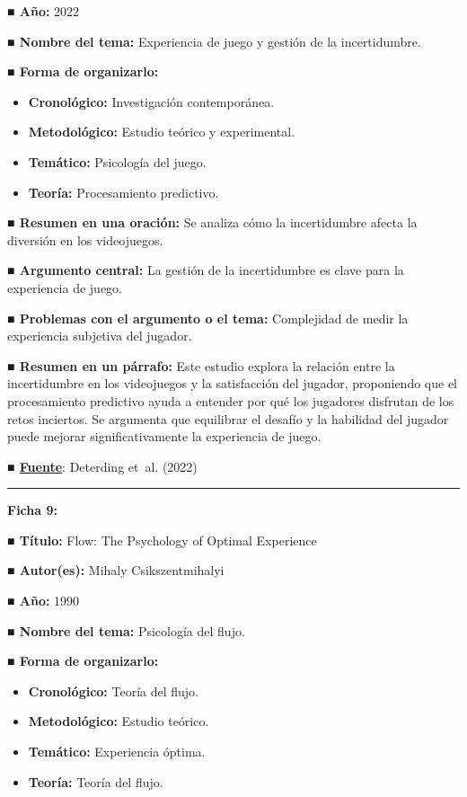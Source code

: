 \documentclass[
  letterpaper,
  DIV=11,
  numbers=noendperiod]{scrreprt}
\begin{document}
\textbf{■ Año:} 2022

\textbf{■ Nombre del tema:} Experiencia de juego y gestión de la
incertidumbre.

\textbf{■ Forma de organizarlo:}

\begin{itemize}
\item
  \textbf{Cronológico:} Investigación contemporánea.
\item
  \textbf{Metodológico:} Estudio teórico y experimental.
\item
  \textbf{Temático:} Psicología del juego.
\item
  \textbf{Teoría:} Procesamiento predictivo.
\end{itemize}

\textbf{■ Resumen en una oración:} Se analiza cómo la incertidumbre
afecta la diversión en los videojuegos.

\textbf{■ Argumento central:} La gestión de la incertidumbre es clave
para la experiencia de juego.

\textbf{■ Problemas con el argumento o el tema:} Complejidad de medir la
experiencia subjetiva del jugador.

\textbf{■ Resumen en un párrafo:} Este estudio explora la relación entre
la incertidumbre en los videojuegos y la satisfacción del jugador,
proponiendo que el procesamiento predictivo ayuda a entender por qué los
jugadores disfrutan de los retos inciertos. Se argumenta que equilibrar
el desafío y la habilidad del jugador puede mejorar significativamente
la experiencia de juego.

\textbf{■
\href{https://www.frontiersin.org/journals/psychology/articles/10.3389/fpsyg.2022.924953/full}{Fuente}}:
Deterding et~al. (2022)

\begin{center}\rule{0.5\linewidth}{0.5pt}\end{center}

\textbf{Ficha 9:}

\textbf{■ Título:} Flow: The Psychology of Optimal Experience

\textbf{■ Autor(es):} Mihaly Csikszentmihalyi

\textbf{■ Año:} 1990

\textbf{■ Nombre del tema:} Psicología del flujo.

\textbf{■ Forma de organizarlo:}

\begin{itemize}
\item
  \textbf{Cronológico:} Teoría del flujo.
\item
  \textbf{Metodológico:} Estudio teórico.
\item
  \textbf{Temático:} Experiencia óptima.
\item
  \textbf{Teoría:} Teoría del flujo.
\end{itemize}
\end{document}
